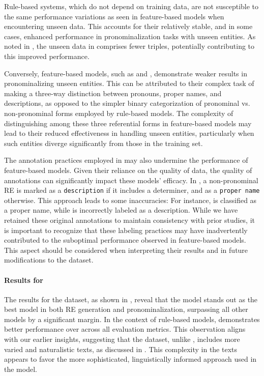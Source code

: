 Rule-based systems, which do not depend on training data, are not susceptible to the same performance variations as seen in feature-based models when encountering unseen data. This accounts for their relatively stable, and in some cases, enhanced performance in pronominalization tasks with unseen entities. As noted in , the unseen data in \webnlg comprises fewer triples, potentially contributing to this improved performance. 

Conversely, feature-based models, such as  and , demonstrate weaker results in pronominalizing unseen entities. This can be attributed to their complex task of making a three-way distinction between pronouns, proper names, and descriptions, as opposed to the simpler binary categorization of pronominal vs. non-pronominal forms employed by rule-based models. The complexity of distinguishing among these three referential forms in feature-based models may lead to their reduced effectiveness in handling unseen entities, particularly when such entities diverge significantly from those in the training set.

The annotation practices employed in \webnlg may also undermine the performance of feature-based models. Given their reliance on the quality of data, the quality of annotations can significantly impact these models' efficacy. In \webnlg, a non-pronominal RE is marked as a \texttt{description} if it includes a determiner, and as a \texttt{proper name} otherwise. This approach leads to some inaccuracies: For instance,  is classified as a proper name, while  is incorrectly labeled as a description. While we have retained these original annotations to maintain consistency with prior studies, it is important to recognize that these labeling practices may have inadvertently contributed to the suboptimal performance observed in feature-based models. This aspect should be considered when interpreting their results and in future modifications to the dataset.

\paragraph*{Results for \wsj}


The results for the \wsj dataset, as shown in , reveal that the  model stands out as the best model in both RE generation and pronominalization, surpassing all other models by a significant margin. In the context of rule-based models,  demonstrates better performance over  across all evaluation metrics. This observation aligns with our earlier insights, suggesting that the \wsj dataset, unlike \webnlg, includes more varied and naturalistic texts, as discussed in . This complexity in the \wsj texts appears to favor the more sophisticated, linguistically informed approach used in the  model.

